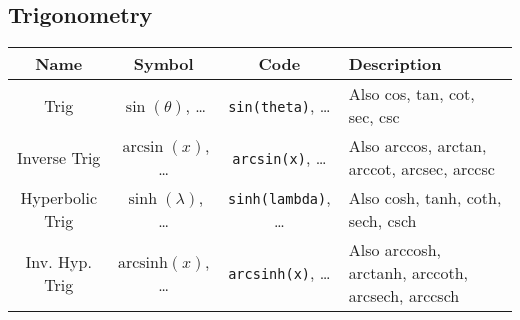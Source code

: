 \documentclass{article}
\begin{document}
  \subsection{Trigonometry} %
  \label{sub:trigonometry}
  \begin{table}[!h]
    \centering
    \begin{tabular}{|c|c|c|l|}
      \hline
      \textbf{Name} & \textbf{Symbol} & \textbf{Code} & \textbf{Description} \\
      \hline\hline
      Trig & \( \sin(\theta) \), \ldots & \texttt{sin(theta)}, \ldots & Also cos, tan, cot, sec, csc \\
      Inverse Trig & \( \arcsin(x) \), \ldots & \texttt{arcsin(x)}, \ldots & Also arccos, arctan, arccot, arcsec, arccsc \\
      Hyperbolic Trig & \( \sinh(\lambda) \), \ldots & \texttt{sinh(lambda)}, \ldots & Also cosh, tanh, coth, sech, csch \\
      Inv. Hyp. Trig & \( \mathrm{arcsinh}(x) \), \ldots & \texttt{arcsinh(x)}, \ldots & Also arccosh, arctanh, arccoth, arcsech, arccsch \\
      \hline
    \end{tabular}
  \end{table}
\end{document}
